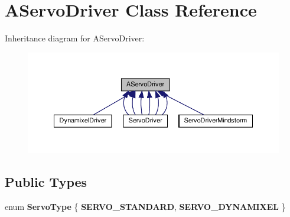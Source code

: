 \hypertarget{classAServoDriver}{}\section{A\+Servo\+Driver Class Reference}
\label{classAServoDriver}


Inheritance diagram for A\+Servo\+Driver\+:
\nopagebreak
\begin{figure}[H]
\begin{center}
\leavevmode
\includegraphics[width=350pt]{classAServoDriver__inherit__graph}
\end{center}
\end{figure}
\subsection*{Public Types}
\begin{DoxyCompactItemize}
\item 
\mbox{\label{classAServoDriver_af202d0a72cdde1d9c0c0eba05e253365}} 
enum {\bfseries Servo\+Type} \{ {\bfseries S\+E\+R\+V\+O\+\_\+\+S\+T\+A\+N\+D\+A\+RD}, 
{\bfseries S\+E\+R\+V\+O\+\_\+\+D\+Y\+N\+A\+M\+I\+X\+EL}
 \}
\end{DoxyCompactItemize}
